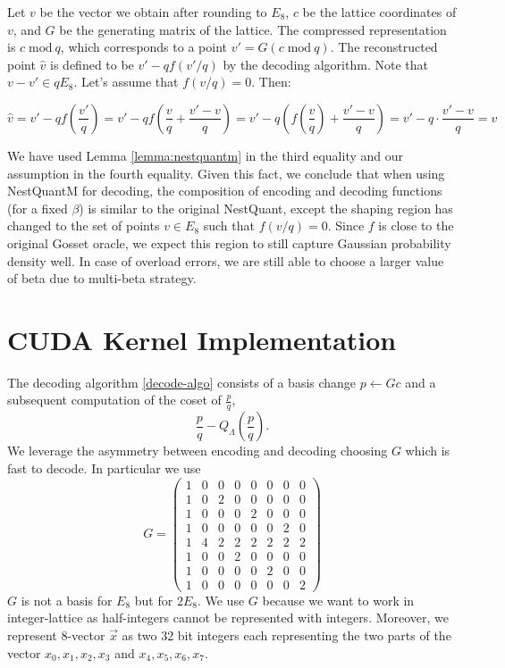 \documentclass{article}
\newcommand{\mmod}[1]{\; \mathrm{mod}\ #1}
\theoremstyle{plain}
\theoremstyle{definition}
\theoremstyle{remark}
\begin{document}
Let $v$ be the vector we obtain after rounding to $E_8$, $c$ be the lattice coordinates of $v$, and $G$ be the generating matrix of the lattice. The compressed representation is $c \mmod q$, which corresponds to a point $v' = G(c \mmod q)$. The reconstructed point $\hat{v}$ is defined to be $v' - qf(v'/q)$ by the decoding algorithm. Note that $v - v' \in qE_8$. Let's assume that $f(v/q) = 0$. Then:

\[
    \hat{v} = v' - qf\left( \frac{v'}{q} \right) = v' - qf\left(\frac{v}{q} + \frac{v'-v}{q}\right) =
    v' - q\left(f\left(\frac{v}{q}\right) + \frac{v'-v}{q}\right) =
    v' - q \cdot \frac{v'-v}{q} = v
\]

We have used Lemma \ref{lemma:nestquantm} in the third equality and our assumption in the fourth equality. Given this fact, we conclude that when using NestQuantM for decoding, the composition of encoding and decoding functions (for a fixed $\beta$) is similar to the original NestQuant, except the shaping region has changed to the set of points $v \in E_8$ such that $f(v/q)=0$. Since $f$ is close to the original Gosset oracle, we expect this region to still capture Gaussian probability density well. In case of overload errors, we are still able to choose a larger value of beta due to multi-beta strategy.

\section{CUDA Kernel Implementation}
The decoding algorithm \ref{decode-algo} consists of a basis change $p\leftarrow Gc$ and a subsequent computation of the coset of $\frac{p}{q}$, $$\frac{p}{q}-Q_{\Lambda}\left(\frac{p}{q}\right).$$ We leverage the asymmetry between encoding and decoding choosing $G$ which is fast to decode. In particular we use $$G=\begin{pmatrix}1 & 0 & 0 & 0 & 0 & 0 &0 & 0\\1& 0 & 2 & 0 & 0 & 0 & 0 & 0\\1 & 0 & 0 & 0  & 2 & 0 & 0 & 0\\1 & 0 & 0 & 0 & 0 & 0 & 2 & 0\\1 & 4 & 2 & 2 & 2 & 2 & 2 & 2\\1 & 0 & 0 & 2 & 0 & 0 & 0 & 0\\1 & 0 & 0 & 0 &0 &2 & 0 & 0\\1 & 0 & 0 & 0 & 0 & 0 & 0 & 2\end{pmatrix}$$
$G$ is not a basis for $E_8$ but for $2E_8$. We use $G$ because we want to work in integer-lattice as half-integers cannot be represented with integers. Moreover, we represent 8-vector $\vec{x}$ as two 32 bit integers each representing the two parts of the vector $x_0,x_1,x_2,x_3$ and $x_4,x_5,x_6,x_7$.
\end{document}
